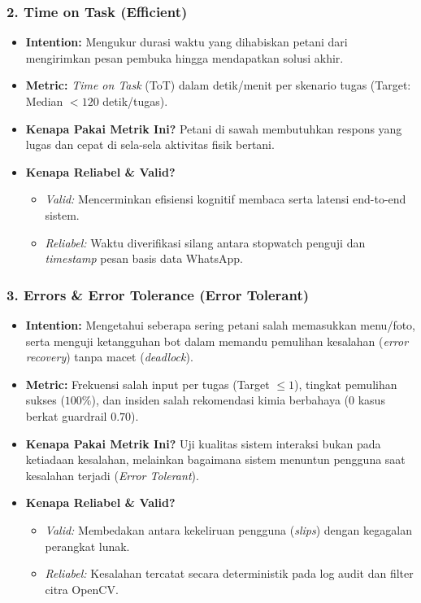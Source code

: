 \documentclass[11pt,a4paper]{article}
\begin{document}
\subsubsection{2. Time on Task (Efficient)}
\begin{itemize}[noitemsep]
    \item \textbf{Intention:} Mengukur durasi waktu yang dihabiskan petani dari mengirimkan pesan pembuka hingga mendapatkan solusi akhir.
    \item \textbf{Metric:} \textit{Time on Task} (ToT) dalam detik/menit per skenario tugas (Target: Median $< 120$ detik/tugas).
    \item \textbf{Kenapa Pakai Metrik Ini?} Petani di sawah membutuhkan respons yang lugas dan cepat di sela-sela aktivitas fisik bertani.
    \item \textbf{Kenapa Reliabel \& Valid?}
    \begin{itemize}[noitemsep]
        \item \textit{Valid:} Mencerminkan efisiensi kognitif membaca serta latensi end-to-end sistem.
        \item \textit{Reliabel:} Waktu diverifikasi silang antara stopwatch penguji dan \textit{timestamp} pesan basis data WhatsApp.
    \end{itemize}
\end{itemize}

\subsubsection{3. Errors \& Error Tolerance (Error Tolerant)}
\begin{itemize}[noitemsep]
    \item \textbf{Intention:} Mengetahui seberapa sering petani salah memasukkan menu/foto, serta menguji ketangguhan bot dalam memandu pemulihan kesalahan (\textit{error recovery}) tanpa macet (\textit{deadlock}).
    \item \textbf{Metric:} Frekuensi salah input per tugas (Target $\le 1$), tingkat pemulihan sukses ($100\%$), dan insiden salah rekomendasi kimia berbahaya ($0$ kasus berkat guardrail $0.70$).
    \item \textbf{Kenapa Pakai Metrik Ini?} Uji kualitas sistem interaksi bukan pada ketiadaan kesalahan, melainkan bagaimana sistem menuntun pengguna saat kesalahan terjadi (\textit{Error Tolerant}).
    \item \textbf{Kenapa Reliabel \& Valid?}
    \begin{itemize}[noitemsep]
        \item \textit{Valid:} Membedakan antara kekeliruan pengguna (\textit{slips}) dengan kegagalan perangkat lunak.
        \item \textit{Reliabel:} Kesalahan tercatat secara deterministik pada log audit dan filter citra OpenCV.
    \end{itemize}
\end{itemize}
\end{document}
